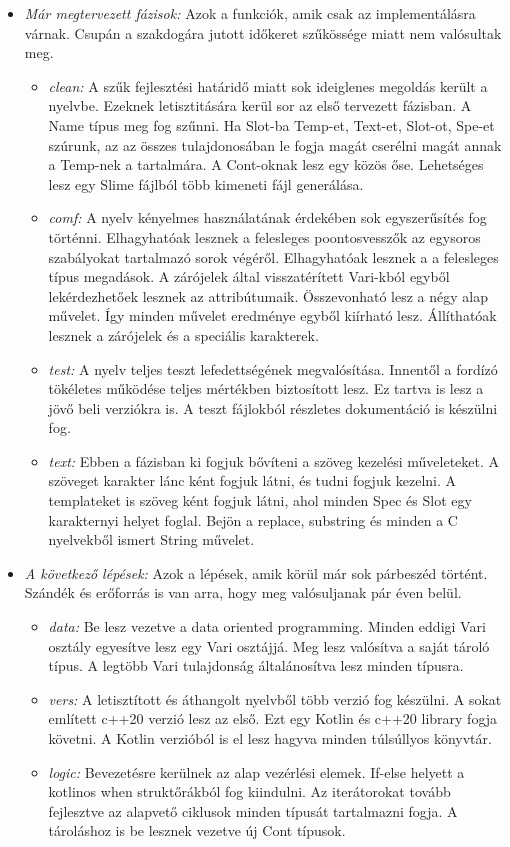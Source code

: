 {\begin{itemize}
\item \emph{Már megtervezett fázisok:}
Azok a funkciók, amik csak az implementálásra várnak.
Csupán a szakdogára jutott időkeret szűkössége miatt nem valósultak meg.
\begin{itemize}
\item \emph{clean:}
A szűk fejlesztési határidő miatt sok ideiglenes megoldás került a nyelvbe.
Ezeknek letisztitására kerül sor az első tervezett fázisban.
A Name típus meg fog szűnni.
Ha Slot-ba Temp-et, Text-et, Slot-ot, Spe-et szúrunk, az az összes tulajdonosában le fogja magát cserélni magát annak a Temp-nek a tartalmára.
A Cont-oknak lesz egy közös őse.
Lehetséges lesz egy Slime fájlból több kimeneti fájl generálása.
\item \emph{comf:}
A nyelv kényelmes használatának érdekében sok egyszerűsítés fog történni.
Elhagyhatóak lesznek a felesleges poontosvesszők az egysoros szabályokat tartalmazó sorok végéről.
Elhagyhatóak lesznek a a felesleges típus megadások.
A zárójelek által visszatérített Vari-kból egyből lekérdezhetőek lesznek az attribútumaik. 
Összevonható lesz a négy alap művelet.
Így minden művelet eredménye egyből kiírható lesz.
Állíthatóak lesznek a zárójelek és a speciális karakterek.
\item \emph{test:}
A nyelv teljes teszt lefedettségének megvalósítása.
Innentől a fordízó tökéletes működése teljes mértékben biztosított lesz.
Ez tartva is lesz a jövő beli verziókra is.
A teszt fájlokból részletes dokumentáció is készülni fog.
\item \emph{text:}
Ebben a fázisban ki fogjuk bővíteni a szöveg kezelési műveleteket.
A szöveget karakter lánc ként fogjuk látni, és tudni fogjuk kezelni.
A templateket is szöveg ként fogjuk látni, ahol minden Spec és Slot egy karakternyi helyet foglal.
Bejön a replace, substring és minden a C nyelvekből ismert String művelet.
\end{itemize}

\item \emph{A következő lépések:}
Azok a lépések, amik körül már sok párbeszéd történt.
Szándék és erőforrás is van arra, hogy meg valósuljanak pár éven belül.
\begin{itemize}
\item \emph{data:}
Be lesz vezetve a data oriented programming.
Minden eddigi Vari osztály egyesítve lesz egy Vari osztájjá.
Meg lesz valósítva a saját tároló típus.
A legtöbb Vari tulajdonság általánosítva lesz minden típusra.
\item \emph{vers:}
A letisztított és áthangolt nyelvből több verzió fog készülni.
A sokat említett c++20 verzió lesz az első.
Ezt egy Kotlin és c++20 library fogja követni.
A Kotlin verzióból is el lesz hagyva minden túlsúllyos könyvtár.
\item \emph{logic:}
Bevezetésre kerülnek az alap vezérlési elemek.
If-else helyett a kotlinos when struktőrákból fog kiindulni.
Az iterátorokat tovább fejlesztve az alapvető ciklusok minden típusát tartalmazni fogja.
A tároláshoz is be lesznek vezetve új Cont típusok.
\end{itemize}


\end{itemize}}
